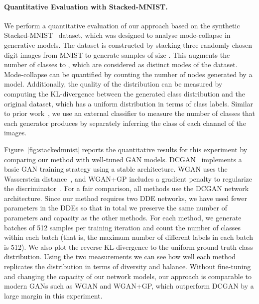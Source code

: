\documentclass{article}
\begin{document}
\paragraph{Quantitative Evaluation with Stacked-MNIST.} We perform a quantitative evaluation of our approach based on the synthetic Stacked-MNIST~\citep{metz2016unrolled} dataset, which was designed to analyse mode-collapse in generative models. The dataset is constructed by stacking three randomly chosen digit images from MNIST to generate samples of size .
This augments the number of classes to , which are considered as distinct modes of the dataset. Mode-collapse can be quantified by counting the number of nodes generated by a model. Additionally, the quality of the distribution can be measured by computing the KL-divergence between the generated class distribution and the original dataset, which has a uniform distribution in terms of class labels. Similar to prior work~\citep{metz2016unrolled}, we use an external classifier to measure the number of classes that each generator produces by separately inferring the class of each channel of the images. 

Figure~\ref{fig:stackedmnist} reports the quantitative results for this experiment by comparing our method with well-tuned GAN models. DCGAN~\citep{radford2015unsupervised} implements a basic GAN training strategy using a stable architecture. WGAN uses the Wasserstein distance~\citep{arjovsky2017wasserstein}, and WGAN+GP includes a gradient penalty to regularize the discriminator~\citep{gulrajani2017improved}. For a fair comparison, all methods use the DCGAN network architecture. Since our method requires two DDE networks, we have used fewer parameters in the DDEs so that in total we preserve the same number of parameters and capacity as the other methods.
For each method, we generate batches of 512 samples per training iteration and count the number of classes within each batch (that is, the maximum number of different labels in each batch is 512). We also plot the reverse KL-divergence to the uniform ground truth class distribution. Using the two measurements we can see how well each method replicates the distribution in terms of diversity and balance. Without fine-tuning and changing the capacity of our network models, our approach is comparable to modern GANs such as WGAN and WGAN+GP, which outperform DCGAN by a large margin in this experiment. 
\end{document}
